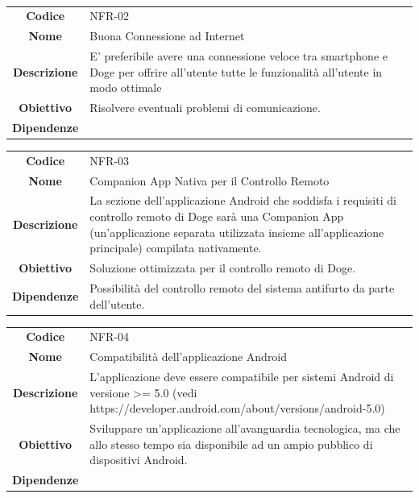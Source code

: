 \documentclass{article}
\begin{document}
    ~
    
    \begin{adjustbox}{center}
    \begin{tabular}{|c|p{10cm}|}
    \hline
    \textbf{Codice} & NFR-02 \\
    \textbf{Nome} & Buona Connessione ad Internet \\
    \textbf{Descrizione} & E' preferibile avere una connessione veloce tra smartphone e Doge per offrire all'utente tutte le funzionalità all'utente in modo ottimale \\
    \textbf{Obiettivo} & Risolvere eventuali problemi di comunicazione. \\
    \textbf{Dipendenze} &  \\
    \hline
    \end{tabular}
    \end{adjustbox}
    
    \begin{adjustbox}{center}
    \begin{tabular}{|c|p{10cm}|}
    \hline
    \textbf{Codice} & NFR-03 \\
    \textbf{Nome} & Companion App Nativa per il Controllo Remoto \\
    \textbf{Descrizione} & La sezione dell'applicazione Android che soddisfa i requisiti di controllo remoto di Doge sarà una Companion App (un'applicazione separata utilizzata insieme all'applicazione principale) compilata nativamente. \\
    \textbf{Obiettivo} & Soluzione ottimizzata per il controllo remoto di Doge. \\
    \textbf{Dipendenze} & Possibilità del controllo remoto del sistema antifurto da parte dell'utente. \\
    \hline
    \end{tabular}
    \end{adjustbox}
    
    \begin{adjustbox}{center}
    \begin{tabular}{|c|p{10cm}|}
    \hline
    \textbf{Codice} & NFR-04 \\
    \textbf{Nome} & Compatibilità dell'applicazione Android \\
    \textbf{Descrizione} & L'applicazione deve essere compatibile per sistemi Android di versione >= 5.0 (vedi https://developer.android.com/about/versions/android-5.0) \\
    \textbf{Obiettivo} & Sviluppare un'applicazione all'avanguardia tecnologica, ma che allo stesso tempo sia disponibile ad un ampio pubblico di dispositivi Android. \\
    \textbf{Dipendenze} &  \\
    \hline
    \end{tabular}
    \end{adjustbox}
    
\end{document}

